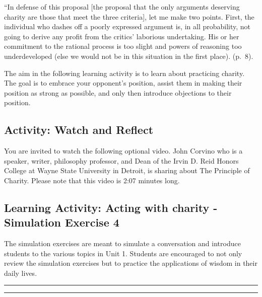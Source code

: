 \documentclass[
]{book}
\begin{document}
``In defense of this proposal {[}the proposal that the only arguments deserving charity are those that meet the three criteria{]}, let me make two points. First, the individual who dashes off a poorly expressed argument is, in all probability, not going to derive any profit from the critics' laborious undertaking. His or her commitment to the rational process is too slight and powers of reasoning too underdeveloped (else we would not be in this situation in the first place). (p.~8).

The aim in the following learning activity is to learn about practicing charity. The goal is to embrace your opponent's position, assist them in making their position as strong as possible, and only then introduce objections to their position.

\hypertarget{activity-watch-and-reflect-4}{%
\subsection*{Activity: Watch and Reflect}\label{activity-watch-and-reflect-4}}

\begin{reflect}
You are invited to watch the following optional video. John Corvino who is a speaker, writer, philosophy professor, and Dean of the Irvin D. Reid Honors College at Wayne State University in Detroit, is sharing about The Principle of Charity. Please note that this video is 2:07 minutes long.
\end{reflect}

\hypertarget{learning-activity-acting-with-charity---simulation-exercise-4}{%
\subsection{Learning Activity: Acting with charity - Simulation Exercise 4}\label{learning-activity-acting-with-charity---simulation-exercise-4}}

The simulation exercises are meant to simulate a conversation and introduce students to the various topics in Unit 1. Students are encouraged to not only review the simulation exercises but to practice the applications of wisdom in their daily lives.

\begin{center}\rule{0.5\linewidth}{0.5pt}\end{center}

\begin{center}\rule{0.5\linewidth}{0.5pt}\end{center}
\end{document}
